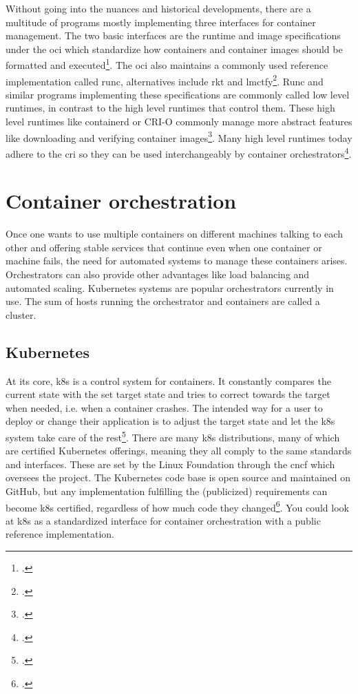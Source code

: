 Without going into the nuances and historical developments, there are a multitude of programs mostly implementing three interfaces for container management.
The two basic interfaces are the runtime and image specifications under the \gls{oci} which standardize how containers and container images should be formatted and executed\footcite[][, first paragraph]{ociStandards}.
The \gls{oci} also maintains a commonly used reference implementation called runc, alternatives include rkt and lmctfy\footcite[][, section 'Examples of Low-Level Container Runtimes']{lowLevelRuntimes}.
Runc and similar programs implementing these specifications are commonly called low level runtimes, in contrast to the high level runtimes that control them.
These high level runtimes like containerd or CRI-O commonly manage more abstract features like downloading and verifying container images\footcite[][, Intro and section 'Examples of High-Level Runtimes']{highLevelRuntimes}.
Many high level runtimes today adhere to the \gls{cri} so they can be used interchangeably by container orchestrators\footcite[][, section 'Purpose']{criGithub}.

\section{Container orchestration}
Once one wants to use multiple containers on different machines talking to each other and offering stable services that continue even when one container or machine fails, the need for automated systems to manage these containers arises. Orchestrators can also provide other advantages like load balancing and automated scaling.
Kubernetes systems are popular orchestrators currently in use.
The sum of hosts running the orchestrator and containers are called a cluster.

\subsection{Kubernetes} \label{k8sTheory}
At its core, \gls{k8s} is a control system for containers.
It constantly compares the current state with the set target state and tries to correct towards the target when needed, i.e. when a container crashes.
The intended way for a user to deploy or change their application is to adjust the target state and let the \gls{k8s} system take care of the rest\footcite[][, section 'Understanding Kubernetes Objects']{k8sObjects}.
There are many \gls{k8s} distributions, many of which are certified Kubernetes offerings, meaning they all comply to the same standards and interfaces. These are set by the Linux Foundation through the \gls{cncf} which oversees the project.
The Kubernetes code base is open source and maintained on GitHub, but any implementation fulfilling the (publicized) requirements can become \gls{k8s} certified, regardless of how much code they changed\footcite[][, section 'There are over 80 Certified Kubernetes offerings.']{certifiedK8s}.
You could look at \gls{k8s} as a standardized interface for container orchestration with a public reference implementation.

